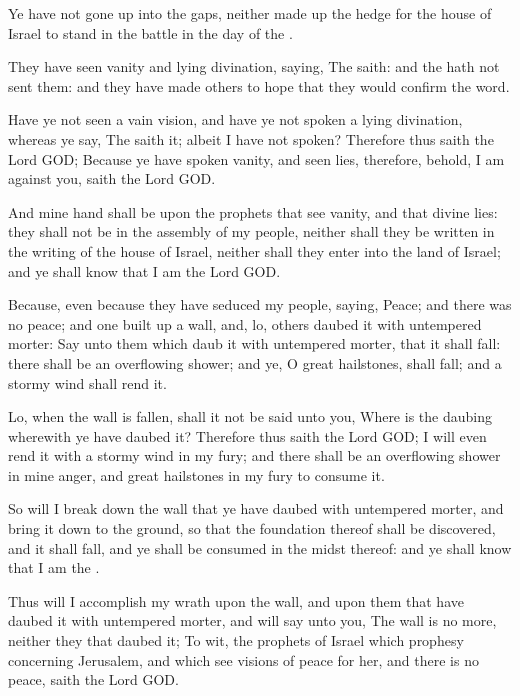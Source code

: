\verse Ye have not gone up into the gaps, neither made up the hedge for the house of Israel to stand in the battle in the day of the \LORD.

\verse They have seen vanity and lying divination, saying, The \LORD saith: and the \LORD hath not sent them: and they have made others to hope that they would confirm the word.

\verse Have ye not seen a vain vision, and have ye not spoken a lying divination, whereas ye say, The \LORD saith it; albeit I have not spoken?  \verse Therefore thus saith the Lord GOD; Because ye have spoken vanity, and seen lies, therefore, behold, I am against you, saith the Lord GOD.

\verse And mine hand shall be upon the prophets that see vanity, and that divine lies: they shall not be in the assembly of my people, neither shall they be written in the writing of the house of Israel, neither shall they enter into the land of Israel; and ye shall know that I am the Lord GOD.

\verse Because, even because they have seduced my people, saying, Peace; and there was no peace; and one built up a wall, and, lo, others daubed it with untempered morter: \verse Say unto them which daub it with untempered morter, that it shall fall: there shall be an overflowing shower; and ye, O great hailstones, shall fall; and a stormy wind shall rend it.

\verse Lo, when the wall is fallen, shall it not be said unto you, Where is the daubing wherewith ye have daubed it?  \verse Therefore thus saith the Lord GOD; I will even rend it with a stormy wind in my fury; and there shall be an overflowing shower in mine anger, and great hailstones in my fury to consume it.

\verse So will I break down the wall that ye have daubed with untempered morter, and bring it down to the ground, so that the foundation thereof shall be discovered, and it shall fall, and ye shall be consumed in the midst thereof: and ye shall know that I am the \LORD.

\verse Thus will I accomplish my wrath upon the wall, and upon them that have daubed it with untempered morter, and will say unto you, The wall is no more, neither they that daubed it; \verse To wit, the prophets of Israel which prophesy concerning Jerusalem, and which see visions of peace for her, and there is no peace, saith the Lord GOD.

